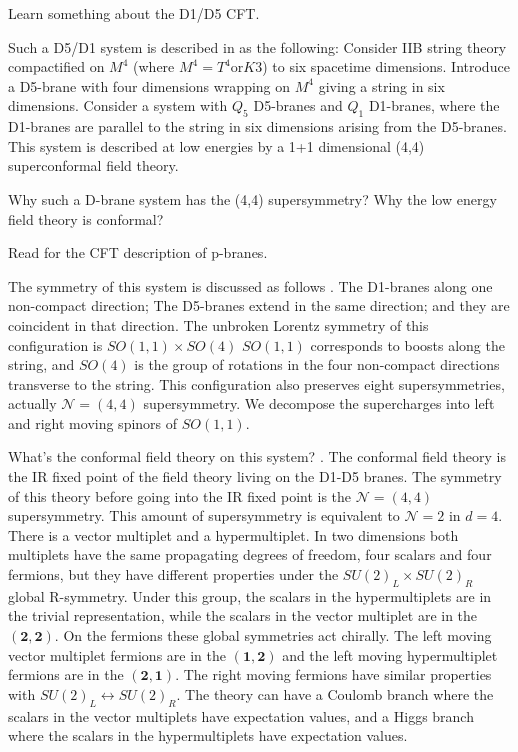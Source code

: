 
\begin{todo}
Learn something about the D1/D5 CFT.	
\end{todo}

Such a D5/D1 system is described in
as the following:
Consider IIB string theory compactified on $M^4$ 
(where $M^4 = T^4 \text{or} K3$)
to six spacetime dimensions.
Introduce a D5-brane
with four dimensions wrapping on $M^4$
giving a string in six dimensions.
Consider a system with $Q_5$ D5-branes and $Q_1$ D1-branes,
where the D1-branes are parallel to the string in six dimensions
arising from the D5-branes.
This system is described at low energies by
a 1+1 dimensional (4,4) superconformal field theory.

\begin{problem}
Why such a D-brane system has the (4,4) supersymmetry?
Why the low energy field theory is conformal?
\end{problem}

\begin{todo}
	Read 
	for the CFT description of p-branes.
\end{todo}

The symmetry of this system is discussed as follows
.
The D1-branes along one non-compact direction;
The D5-branes extend in the same direction;
and they are coincident in that direction.
The unbroken Lorentz symmetry of this configuration is $SO(1,1)\times SO(4)$
$SO(1,1)$ corresponds to boosts along the string,
and $SO(4)$ is the group of rotations
in the four non-compact directions transverse to the string.
This configuration also preserves eight supersymmetries,
actually $\mathcal{N}=(4,4)$ supersymmetry.
We decompose the supercharges into left and right moving spinors of $SO(1,1)$.

What's the conformal field theory on this system?
.
The conformal field theory is the IR fixed point of the field theory
living on the D1-D5 branes.
The symmetry of this theory before going into the IR fixed point
is the $\mathcal{N} = (4,4)$ supersymmetry.
This amount of supersymmetry is equivalent to $\mathcal{N}=2$ in $d=4$.
There is a vector multiplet and a hypermultiplet.
In two dimensions both multiplets have the same propagating degrees of freedom,
four scalars and four fermions,
but they have different properties under the $SU(2)_{L} \times SU(2)_{R}$
global R-symmetry.
Under this group, the scalars in the hypermultiplets are in the trivial representation,
while the scalars in the vector multiplet are in the $(\mathbf{2},\mathbf{2})$.
On the fermions these global symmetries act chirally.
The left moving vector multiplet fermions are in the $(\mathbf{1},\mathbf{2})$
and the left moving hypermultiplet fermions are in the $(\mathbf{2},\mathbf{1})$.
The right moving fermions have similar properties with
$SU(2)_L \leftrightarrow SU(2)_R$.
The theory can have a Coulomb branch
where the scalars in the vector multiplets have expectation values,
and a Higgs branch
where the scalars in the hypermultiplets have expectation values.

